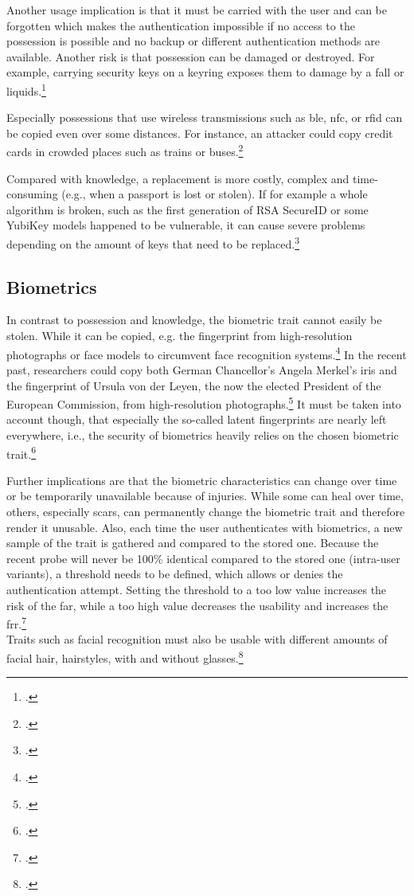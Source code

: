 Another usage implication is that it must be carried with the user and can be forgotten which makes the authentication impossible if no access to the possession is possible and no backup or different authentication methods are available. Another risk is that possession can be damaged or destroyed. For example, carrying security keys on a keyring exposes them to damage by a fall or liquids.\footcites[See][263--264]{shostack2014threat}

Especially possessions that use wireless transmissions such as \gls{ble}, \gls{nfc}, or \gls{rfid} can be copied even over some distances. For instance, an attacker could copy credit cards in crowded places such as trains or buses.\footcite[See][]{6892730}

Compared with knowledge, a replacement is more costly, complex and time-consuming (e.g., when a passport is lost or stolen). If for example a whole algorithm is broken, such as the first generation of RSA SecureID or some YubiKey models happened to be vulnerable, it can cause severe problems depending on the amount of keys that need to be replaced.\footcites[See][18]{dasgupta2017multi}[See][]{BIRYUKOV2005364}[See][]{yubikey-heise}

\subsection{Biometrics}

In contrast to possession and knowledge, the biometric trait cannot easily be stolen. While it can be copied, e.g. the fingerprint from high-resolution photographs or 
face models to circumvent face recognition systems.\footcites[][]{185181}[][]{220566} In the recent past, researchers could copy both German Chancellor's Angela Merkel's iris and the fingerprint of Ursula von der Leyen, the now the elected President of the European Commission, from high-resolution photographs.\footcite{ccc-merkel} It must be taken into account though, that especially the so-called latent fingerprints are nearly left everywhere, i.e., the security of biometrics heavily relies on the chosen biometric trait.\footcite[See][299]{Vacca2017aa}

Further implications are that the biometric characteristics can change over time or be temporarily unavailable because of injuries. While some can heal over time, others, especially scars, can permanently change the biometric trait and therefore render it unusable. Also, each time the user authenticates with biometrics, a new sample of the trait is gathered and compared to the stored one. Because the recent probe will never be 100\% identical compared to the stored one (\frqq intra-user variants\flqq), a threshold needs to be defined, which allows or denies the authentication attempt. Setting the threshold to a too low value increases the risk of the \gls{far}, while a too high value decreases the usability and increases the \gls{frr}.\footcite[See][13--17, 52]{Jain2011}\\Traits such as facial recognition must also be usable with different amounts of facial hair, hairstyles, with and without glasses.\footcite[See][98]{Jain2011}

